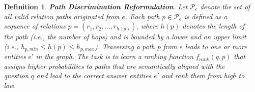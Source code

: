 \documentclass[conference]{IEEEtran}
\newtheorem{definition}{Definition}
\begin{document}




\begin{definition}
\textbf{Path Discrimination Reformulation}. Let $\mathcal{P}_e$ denote the set of all valid relation paths originated from $e$. Each path $p \in \mathcal{P}_e$ is defined as a sequence of relations $p = (r_1, r_2, \dots, r_{h(p)})$, where $h(p)$ denotes the length of the path (i.e., the number of hops) and is bounded by a lower and an upper limit (i.e., $h_{p,min} \leq h(p) \leq h_{p,max}$).  Traversing a path $p$ from $e$ leads to one or more entities $e'$ in the graph. The task is to learn a ranking function $f_{rank}(q, p)$ that assigns higher probabilities to paths that are semantically aligned with the question $q$ and lead to the correct answer entities $e'$ and rank them from high to low. 
\end{definition}
\end{document}
